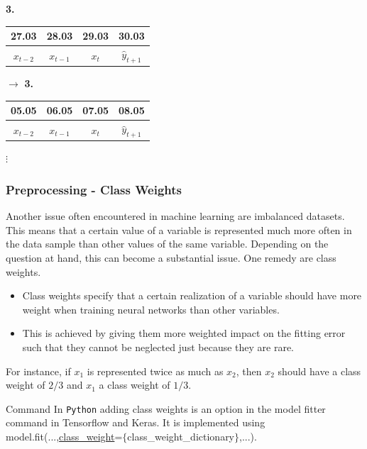 \documentclass[xcolor=dvipsnames, english, 8pt]{beamer}
\begin{document}
\begin{frame}
\begin{table}[t]
\centering
\textbf{3.} \begin{tabular}{|c|c|c|c|}
\hline
 27.03 & 28.03 & 29.03 & 30.03\\
\hline
 {\color{green!50}$x_{t-2}$} & {\color{green!50}$x_{t-1}$} & {\color{green!50}$x_{t}$} & {\color{red!50}$\hat{y}_{t+1}$}\\
\hline
\end{tabular}
\hspace{0.25cm}$\longrightarrow$\hspace{0.25cm}
\textbf{3.} \begin{tabular}{|c|c|c|c|}
\hline
05.05 & 06.05 & 07.05 & 08.05\\
\hline
 {\color{green!50}$x_{t-2}$} & {\color{green!50}$x_{t-1}$} & {\color{green!50}$x_{t}$} & {\color{red!50}$\hat{y}_{t+1}$}\\
\hline
\end{tabular}
\end{table}
\begin{center}
    $\vdots$
\end{center}

\end{frame}

\begin{frame}
    \frametitle{Preprocessing - Class Weights}
    Another issue often encountered in machine learning are {\color{ubRed}imbalanced datasets}. This means that a certain value of a variable is represented much more often in the data sample than other values of the same variable. Depending on the question at hand, this can become a substantial issue. One remedy are {\color{ubRed} class weights}.\vspace{0.25cm}\\
    \begin{itemize}
    \item Class weights specify that a certain realization of a variable should have more weight when training neural networks than other variables.
    \item  This is achieved by giving them more weighted impact on the fitting error such that they cannot be neglected just because they are rare.\vspace{0.25cm}\\
\end{itemize}
    For instance, if $x_1$ is represented twice as much as $x_2$, then $x_2$ should have a class weight of $2/3$ and $x_1$ a class weight of $1/3$.
    \vfill
    \begin{exampleblock}{{\small{Command}}}
    In \texttt{Python}  adding class weights is an option in the model fitter command in Tensorflow and Keras. It is implemented using model.fit(...,\href{https://keras.io/models/model/\#fit}{\color{Purple}class\_weight}=$\{$class\_weight\_dictionary$\}$,...).
    \end{exampleblock}
\end{frame}
\end{document}
